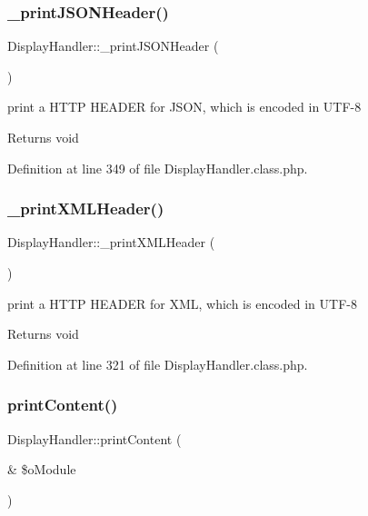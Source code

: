\subsubsection{\texorpdfstring{\+\_\+print\+J\+S\+O\+N\+Header()}{\_printJSONHeader()}}
{\footnotesize\ttfamily Display\+Handler\+::\+\_\+print\+J\+S\+O\+N\+Header (\begin{DoxyParamCaption}{ }\end{DoxyParamCaption})}

print a H\+T\+TP H\+E\+A\+D\+ER for J\+S\+ON, which is encoded in U\+T\+F-\/8 \begin{DoxyReturn}{Returns}
void 
\end{DoxyReturn}


Definition at line 349 of file Display\+Handler.\+class.\+php.

\mbox{\label{classDisplayHandler_ac1f3197b7ada7152aacf72730f34571b}} 
\subsubsection{\texorpdfstring{\+\_\+print\+X\+M\+L\+Header()}{\_printXMLHeader()}}
{\footnotesize\ttfamily Display\+Handler\+::\+\_\+print\+X\+M\+L\+Header (\begin{DoxyParamCaption}{ }\end{DoxyParamCaption})}

print a H\+T\+TP H\+E\+A\+D\+ER for X\+ML, which is encoded in U\+T\+F-\/8 \begin{DoxyReturn}{Returns}
void 
\end{DoxyReturn}


Definition at line 321 of file Display\+Handler.\+class.\+php.

\mbox{\label{classDisplayHandler_a40cee7b6783514fb596d4e595e5fc0f7}} 
\subsubsection{\texorpdfstring{print\+Content()}{printContent()}}
{\footnotesize\ttfamily Display\+Handler\+::print\+Content (\begin{DoxyParamCaption}\item[{\&}]{\$o\+Module }\end{DoxyParamCaption})}

